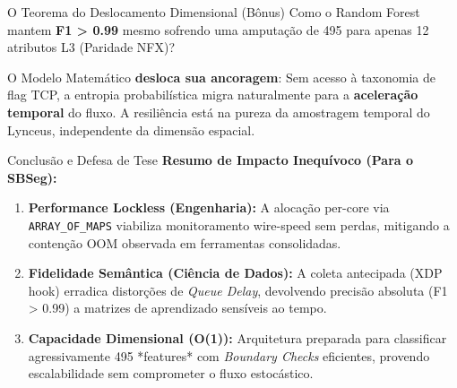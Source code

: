 \documentclass[aspectratio=169,11pt]{beamer}
\begin{document}
\begin{frame}{O Teorema do Deslocamento Dimensional (Bônus)}
    Como o Random Forest mantem \textbf{F1 > 0.99} mesmo sofrendo uma amputação de 495 para apenas 12 atributos L3 (Paridade NFX)?
    \vspace{0.2cm}

    \begin{table}[]
        \centering
    \end{table}

    \vspace{0.2cm}
    O Modelo Matemático \textbf{desloca sua ancoragem}: Sem acesso à taxonomia de flag TCP, a entropia probabilística migra naturalmente para a \textbf{aceleração temporal} do fluxo. A resiliência está na pureza da amostragem temporal do Lynceus, independente da dimensão espacial.
\end{frame}

\begin{frame}{Conclusão e Defesa de Tese}
    \textbf{Resumo de Impacto Inequívoco (Para o SBSeg):}
    \vspace{0.3cm}
    
    \begin{enumerate}
        \item \textbf{Performance Lockless (Engenharia):} A alocação per-core via \texttt{ARRAY\_OF\_MAPS} viabiliza monitoramento wire-speed sem perdas, mitigando a contenção OOM observada em ferramentas consolidadas.
        \item \textbf{Fidelidade Semântica (Ciência de Dados):} A coleta antecipada (XDP hook) erradica distorções de \textit{Queue Delay}, devolvendo precisão absoluta (F1 > 0.99) a matrizes de aprendizado sensíveis ao tempo.
        \item \textbf{Capacidade Dimensional (O(1)):} Arquitetura preparada para classificar agressivamente 495 *features* com \textit{Boundary Checks} eficientes, provendo escalabilidade sem comprometer o fluxo estocástico.
    \end{enumerate}
\end{frame}
\end{document}
